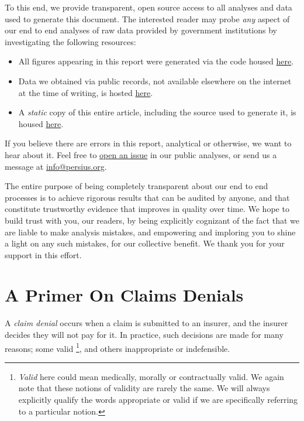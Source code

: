 \documentclass[12pt, a4paper,twoside,parskip=full]{report}
\theoremstyle{plain} %
\theoremstyle{definition} %
\theoremstyle{remark} %
\numberwithin{equation}{chapter}
\begin{document}
		
		To this end, we provide transparent, open source access to all analyses and data used to
		generate this document. The interested reader may probe \emph{any} aspect of our end to end 
		analyses of raw data provided by government institutions by investigating the following resources:
		
		\begin{itemize}
			\item All figures appearing in this report were
			generated via the code housed
			\href{https://github.com/TPAFS/investigations/tree/initial_denial_investigation/investigations/claims_denials}{here}.
			
			\item Data we obtained via public records, not available elsewhere on the internet at the time of writing, is hosted \href{https://github.com/TPAFS/public-records}{here}.
			
			\item A \emph{static} copy of this entire article, including the source used to generate it,
			is housed \href{https://github.com/TPAFS/investigations/tree/main/investigations/claims_denials/latex}{here}.
			
		\end{itemize}
		
		If you believe there are errors in this report, analytical or otherwise, we want to hear about it.
		Feel free to \href{https://github.com/TPAFS/investigations/issues}{open an issue}
		in our public analyses, or send us a message at \href{info@persius.org}{info@persius.org}.
		
		The entire purpose of being completely transparent about our end to end processes is to achieve rigorous 
		results that can be audited by anyone, and that constitute trustworthy evidence that improves in quality over
		time.  We hope to build trust with you, our readers,
		by being explicitly cognizant of the fact that we are liable to make analysis mistakes, and empowering and imploring
		you to shine a light on any such mistakes, for our collective benefit. We thank you for your support in this effort.
	
		
		\chapter{A Primer On Claims Denials}\label{primer}
		
		A \emph{claim denial} occurs when a claim is submitted to an insurer, and the insurer decides they will not pay for it. In practice, such decisions are made for many reasons; some valid \footnote{\emph{Valid} here could mean medically, morally or contractually valid. We again note that these notions of validity are rarely the same. We will always explicitly qualify the words appropriate or valid if we are specifically referring to a particular notion.}, and others inappropriate or indefensible.
		
\end{document}
